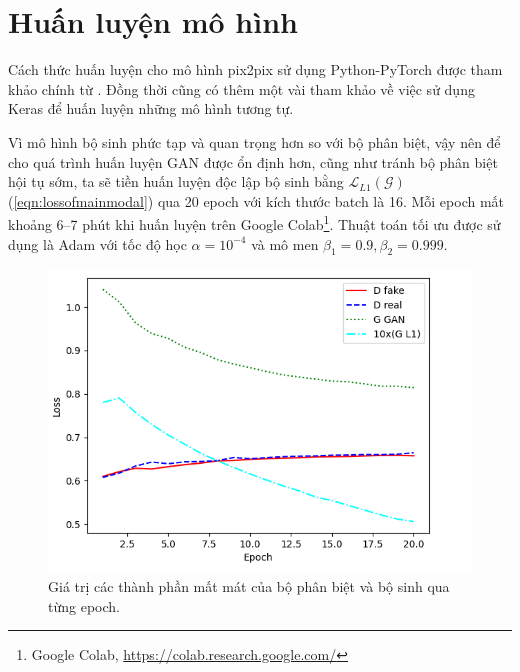 \documentclass[a4paper, 12pt]{report}
\begin{document}
\section{Huấn luyện mô hình}

Cách thức huấn luyện cho mô hình pix2pix sử dụng Python-PyTorch được tham khảo chính từ \cite{aladdinperssonyoutube, moeincolorization2020, junyanzho2020}.
Đồng thời cũng có thêm một vài tham khảo về việc sử dụng Keras \cite{tuannguyenpix2pix2020, khanhpix2pix2020, jasonpix2pix2019} để huấn luyện những mô hình tương tự.\vspace{5pt}

Vì mô hình bộ sinh phức tạp và quan trọng hơn so với bộ phân biệt, vậy nên để cho quá trình huấn luyện GAN được ổn định hơn, cũng như tránh bộ phân biệt hội tụ sớm, ta sẽ tiền huấn luyện \cite{ham2020unbalanced} độc lập bộ sinh bằng $\mathcal{L}_{L1}\left(\mathcal{G}\right)$ (\ref{eqn:lossofmainmodal}) qua 20 epoch với kích thước batch là 16.
Mỗi epoch mất khoảng 6--7 phút khi huấn luyện trên Google Colab\footnote{Google Colab, \href{https://colab.research.google.com/}{https://colab.research.google.com/}}.
Thuật toán tối ưu được sử dụng là Adam \cite{kingma2017adam} với tốc độ học $\alpha = 10^{-4}$ và mô men $\beta_1 = 0.9, \beta_2=0.999$.\vspace{5pt}

\begin{figure}[!h]
\captionsetup{width=0.8\textwidth}
\centering
\includegraphics[width=15cm]{images/3_6.png}
\caption{Giá trị các thành phần mất mát của bộ phân biệt và bộ sinh qua từng epoch.}
\label{fig:losstrainning}
\end{figure}
\end{document}
